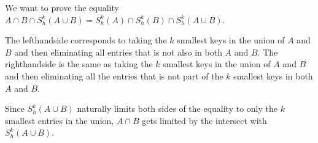 
We want to prove the equality $A \cap B \cap S^{k}_{h}(A \cup B) = S^{k}_{h}(A)
\cap S^{k}_{h}(B) \cap S^{k}_{h}(A \cup B)$.

The lefthandside corresponds to taking the $k$ smallest keys in the union of
$A$ and $B$ and then eliminating all entries that is not also in both $A$ and
$B$.
%
The righthandside is the same as taking the $k$ smallest keys in the union of
$A$ and $B$ and then eliminating all the entries that is not part of the $k$
smallest keys in both $A$ and $B$.

Since $S^{k}_{h}(A \cup B)$ naturally limits both sides of the equality to only
the $k$ smallest entries in the union, $A \cap B$ gets limited by the intersect
with $S^{k}_{h}(A \cup B)$.


